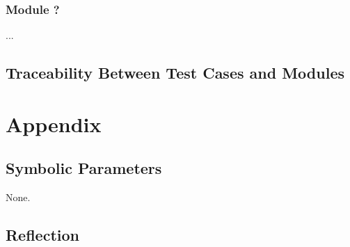 \documentclass[12pt, titlepage]{article}
\begin{document}
\subsubsection{Module ?}

...

\subsection{Traceability Between Test Cases and Modules}

				




\newpage

\section{Appendix}

\subsection{Symbolic Parameters}

None.

\subsection{Reflection}
\end{document}
